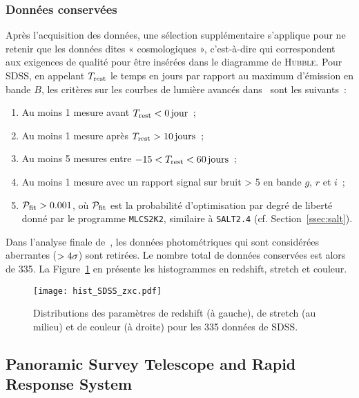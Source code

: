 \documentclass[../main/main.tex]{subfiles}
\begin{document}
\subsubsection{Données conservées}\label{sssec:sdssdata}

Après l'acquisition des données, une sélection supplémentaire s'applique pour ne
retenir que les données dites « cosmologiques », c'est-à-dire qui correspondent
aux exigences de qualité pour être insérées dans le diagramme de
\textsc{Hubble}. Pour SDSS, en appelant $T_{\rm rest}$ le temps en jours par
rapport au maximum d'émission en bande $B$, les critères sur les courbes de
lumière avancés dans~\cite{kessler2009b} sont les suivants~:

\begin{enumerate}
    \item Au moins 1 mesure avant $T_{\rm rest} < \SI{0}{jour}$~;
    \item Au moins 1 mesure après $T_{\rm rest} > \SI{10}{jours}$~;
    \item Au moins 5 mesures entre $-15 < T_{\rm rest} < \SI{60}{jours}$~;
    \item Au moins 1 mesure avec un rapport signal sur bruit > 5 en bande $g$,
        $r$ et $i$~;
    \item $\mathcal{P}_{\rm fit} > 0.001$, où $\mathcal{P}_{\rm fit}$ est la
        probabilité d'optimisation par degré de liberté donné par le programme
        \texttt{MLCS2K2}, similaire à \texttt{SALT2.4} (cf.
        Section~\ref{ssec:salt}).
\end{enumerate}
Dans l'analyse finale de~\cite{scolnic2018}, les données photométriques qui sont
considérées aberrantes ($>4\sigma$) sont retirées. Le nombre total de données
conservées est alors de 335. La Figure~\ref{fig:sdsshist} en présente les
histogrammes en redshift, stretch et couleur.

\begin{figure}[h]
    \centering
    \texttt{[image: hist\_SDSS\_zxc.pdf]}
    \captionsetup{justification=centering}
    \caption{Distributions des paramètres de redshift (à gauche), de stretch (au
    milieu) et de couleur (à droite) pour les 335 données de SDSS.}
    \label{fig:sdsshist}
\end{figure}

\subsection{Panoramic Survey Telescope and Rapid Response
System}\label{ssec:ps1}
\end{document}
